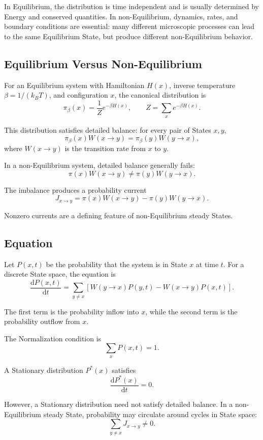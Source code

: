 \documentclass[a4paper, 10pt, onepage]{elegantbook}
\begin{document}
{In Equilibrium, the distribution is time independent and is usually determined
by Energy and conserved quantities. In non-Equilibrium, dynamics, rates, and
boundary conditions are essential: many different microscopic processes can
lead to the same Equilibrium State, but produce different non-Equilibrium
behavior.

\subsection{Equilibrium Versus Non-Equilibrium}

For an Equilibrium system with Hamiltonian \(H(x)\), inverse temperature
\(\beta=1/(k_BT)\), and configuration \(x\), the canonical distribution is
\[
\pi_\beta(x)
=
\frac{1}{Z}
e^{-\beta H(x)},
\qquad
Z=\sum_xe^{-\beta H(x)}.
\]

This distribution satisfies detailed balance: for every pair of States \(x,y\),
\[
\pi_\beta(x)W(x\to y)
=
\pi_\beta(y)W(y\to x),
\]
where \(W(x\to y)\) is the transition rate from \(x\) to \(y\).

In a non-Equilibrium system, detailed balance generally fails:
\[
\pi(x)W(x\to y)
\ne
\pi(y)W(y\to x).
\]

The imbalance produces a probability current
\[
J_{x\to y}
=
\pi(x)W(x\to y)
-
\pi(y)W(y\to x).
\]

Nonzero currents are a defining feature of non-Equilibrium steady States.

\subsection{Equation}

Let \(P(x,t)\) be the probability that the system is in State \(x\) at time
\(t\). For a discrete State space, the equation is
\[
\frac{\mathrm dP(x,t)}{\mathrm dt}
=
\sum_{y\ne x}
\left[
W(y\to x)P(y,t)
-
W(x\to y)P(x,t)
\right].
\]

The first term is the probability inflow into \(x\), while the second term is
the probability outflow from \(x\).

The Normalization condition is
\[
\sum_xP(x,t)=1.
\]

A Stationary distribution \(P^*(x)\) satisfies
\[
\frac{\mathrm dP^*(x)}{\mathrm dt}=0.
\]

However, a Stationary distribution need not satisfy detailed balance. In a
non-Equilibrium steady State, probability may circulate around cycles in State
space:
\[
\sum_{y\ne x}J_{x\to y}\ne0.
\]

}
\end{document}
